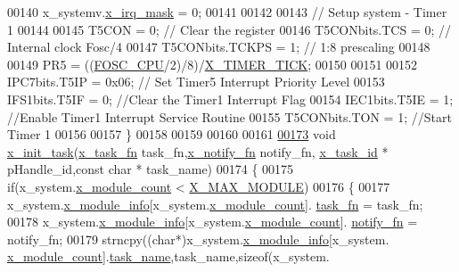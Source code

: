 \begin{DoxyCode}
00140     x\_systemv.\hyperlink{a00037_a1385e454a9fbfdfe2af2b8a743789483}{x\_irq\_mask}           = 0;
00141 
00142 
00143     \textcolor{comment}{// Setup system - Timer 1}
00144     
00145     T5CON = 0;                  \textcolor{comment}{// Clear the register}
00146     T5CONbits.TCS   = 0;        \textcolor{comment}{// Internal clock Fosc/4}
00147     T5CONbits.TCKPS = 1;        \textcolor{comment}{//    1:8 prescaling}
00148 
00149     PR5 = ((\hyperlink{a00072_a64b7f2fd4683ad3dcd74ccab1eba40d7}{FOSC\_CPU}/2)/8)/\hyperlink{a00036_ac606e478c91dc9a2ddc0816152b18979}{X\_TIMER\_TICK};
00150     
00151     
00152     IPC7bits.T5IP = 0x06;         \textcolor{comment}{// Set Timer5 Interrupt Priority Level}
00153     IFS1bits.T5IF = 0;            \textcolor{comment}{//Clear the Timer1 Interrupt Flag}
00154     IEC1bits.T5IE = 1;            \textcolor{comment}{//Enable Timer1 Interrupt Service Routine}
00155     T5CONbits.TON = 1;            \textcolor{comment}{//Start Timer 1}
00156 
00157 \}
00158 
00159 
00160 
00161 
\hypertarget{a00037_source_l00173}{}\hyperlink{a00037_a1e79db5ed3ab326586129eb4d7b63d46}{00173} \textcolor{keywordtype}{void}  \hyperlink{a00037_a1e79db5ed3ab326586129eb4d7b63d46}{x\_init\_task}(\hyperlink{a00036_ace830f248538d21bb16ea9c00997fcd7}{x\_task\_fn} task\_fn,\hyperlink{a00036_a29c1adcba84e0c3e83657c91e9b2b764}{x\_notify\_fn} notify\_fn,
      \hyperlink{a00036_ad5c3c5fbfd3e4aadf22830395484a71d}{x\_task\_id} * pHandle\_id,\textcolor{keyword}{const} \textcolor{keywordtype}{char} * task\_name)
00174 \{
00175     \textcolor{keywordflow}{if}(x\_system.\hyperlink{a00037_a80c19e87a59b3ee9def711195641cd26}{x\_module\_count} < \hyperlink{a00037_a04282f21b2fb8a316c5d04a2dfd24eaa}{X\_MAX\_MODULE})
00176     \{
00177         x\_system.\hyperlink{a00037_a6724d1e1430a0e89c134b30152988385}{x\_module\_info}[x\_system.\hyperlink{a00037_a80c19e87a59b3ee9def711195641cd26}{x\_module\_count}].
      \hyperlink{a00037_ab14ce9c8fe0edb516f7f3d4e1e3a8854}{task\_fn}   = task\_fn;
00178         x\_system.\hyperlink{a00037_a6724d1e1430a0e89c134b30152988385}{x\_module\_info}[x\_system.\hyperlink{a00037_a80c19e87a59b3ee9def711195641cd26}{x\_module\_count}].
      \hyperlink{a00037_af6e2104c75f84286ef0f813c7707ff11}{notify\_fn} = notify\_fn;
00179         strncpy((\textcolor{keywordtype}{char}*)x\_system.\hyperlink{a00037_a6724d1e1430a0e89c134b30152988385}{x\_module\_info}[x\_system.
      \hyperlink{a00037_a80c19e87a59b3ee9def711195641cd26}{x\_module\_count}].\hyperlink{a00037_a530a0539bc1522a85f661b6e1c9ebebd}{task\_name},task\_name,\textcolor{keyword}{sizeof}(x\_system.

\end{DoxyCode}

